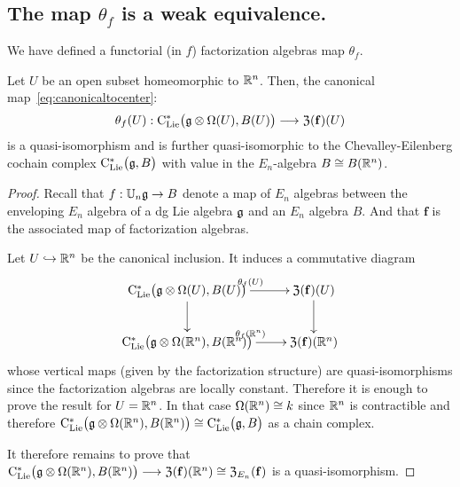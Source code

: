 \documentclass[11pt]{amsart}
\numberwithin{equation}{section}
\begin{document}
\subsection{The map $\theta_f$ is a weak equivalence.} 
We have defined a functorial (in $f$) factorization algebras map 
$\theta_f$. 


\begin{lmm}\label{L:thetaquisondisk}Let $U$ be an open subset homeomorphic to $\mathbb R^n$. 
 Then, the canonical map~\eqref{eq:canonicaltocenter}:
 \[\theta_f(U): {\rm C}_{\rm Lie}^*\big(\mathfrak g\otimes \Omega (U), B(U) \big) \longrightarrow 
 {\frak Z}(\mathbf{f})(U)\] is a quasi-isomorphism and is further quasi-isomorphic 
 to the Chevalley-Eilenberg cochain complex ${\rm C}_{\rm Lie}^* \big(\mathfrak g, B\big)$ 
 with value in the $E_n$-algebra $B\cong B(\mathbb R^n)$.
\end{lmm}
\begin{proof}
Recall that $f: \mathbb U_n \mathfrak g \to B$ denote a map of $E_n$ algebras between the enveloping $E_n$ algebra of a dg Lie algebra $\mathfrak g$ and an $E_n$ algebra $B$.
And that $\mathbf{f}$ is the associated map of factorization algebras. 

Let $U\hookrightarrow \mathbb R^n$ be the canonical inclusion. It induces a commutative diagram 
 \[ \xymatrix{ \clies\big(\fg\otimes \Omega (U), B(U) \big) \ar[d] \ar[r]^{\theta_f(U)} &
\ar[d] {\frak Z}(\mathbf{f})(U)\\
 \clies\big(\fg\otimes \Omega (\RR^n), B(\RR^n) \big)
 \ar[r]^{\theta_f(\RR^n)}& {\frak Z}(\mathbf{f})(\RR^n)}  \]
whose vertical maps (given by the factorization structure) are quasi-isomorphisms since the factorization algebras 
are locally constant. 
Therefore it is enough to prove the result for $U=\mathbb R^n$. 
In that case $\Omega(\mathbb R^n) \cong k$ since $\mathbb R^n$ is contractible and therefore  ${\rm C}_{\rm Lie}^*\big(\mathfrak g\otimes \Omega (\mathbb R^n), B(\mathbb R^n) \big) \cong {\rm C}_{\rm Lie}^* \big(\mathfrak g, B\big)$ as a chain complex.

It therefore remains to prove that 
${\rm C}_{\rm Lie}^*\big(\mathfrak g\otimes \Omega (\mathbb R^n), B(\mathbb R^n) \big) \longrightarrow 
 {\frak Z}(\mathbf{f})(\mathbb R^n)\cong {\frak Z}_{E_n}(\mathbf{f})$ is a quasi-isomorphism. 
 
 \smallskip 


\end{proof}
\end{document}
